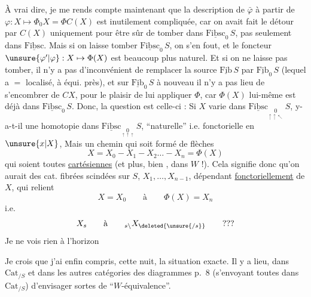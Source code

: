 À vrai dire, je me rends compte maintenant que la description de $\bar\varphi$ à partir de $\varphi:X\longmapsto\Phi_0 X=\Phi C(X)$ est inutilement compliquée, car on avait fait le détour par $C(X)$ uniquement pour être sûr de tomber dans $\underline{\mathrm{Fibsc}}_0\,S$, pas seulement dans $\underline{\mathrm{Fibsc}}$.
Mais si on laisse tomber $\underline{\mathrm{Fibsc}}_0\,S$, on s'en fout, et le foncteur $\unsure{\varphi'|\varphi}:X\mapsto\Phi(X)$ est beaucoup plus naturel. Et  si on ne laisse pas tomber, il n'y a pas d'inconvénient de remplacer la source $\underline{\mathrm{Fib}}\,S$
par $\underline{\mathrm{Fib}}_0\,S$ (lequel a $=$ localisé, à équi. près), et sur $\underline{\mathrm{Fib}}_0\,S$ à nouveau il n'y a pas lieu de s'encombrer de $CX$, pour le plaisir de lui appliquer $\Phi$, car $\Phi(X)$ lui-même est déjà dans $\underline{\mathrm{Fibsc}}_0\,S$. Donc, la question est celle-ci : Si $X$ varie
dans $\underline{\mathrm{Fibsc}}_{\underset{\uparrow\uparrow\nwarrow}{0}}\,S$, y-a-t-il une homotopie dans $\underline{\mathrm{Fibsc}}_{\underset{\uparrow\uparrow\uparrow}{0}}\,S$, ``naturelle'' i.e. fonctorielle en $\unsure{x|X}$,
Mais un chemin qui soit formé de flèches
\[
 X=X_0\mathbin{-}X_1\mathbin{-}X_2\ldots\mathbin{-}X_n=\Phi(X)
\]
qui soient toutes \uline{cartésiennes} (et  plus, bien , dans $W$ !). Cela signifie donc qu'on  aurait des  cat. fibrées scindées sur $S$, $X_1,\ldots,X_{n-1}$, dépendant \uline{fonctoriellement} de $X$, qui relient
\[
 X=X_0\qquad \text{à}\qquad \Phi(X)=X_n
\]
i.e.
\[
 X_s\qquad\text{à}\qquad {}_{s\backslash}X_{\deleted{\unsure{/s}}}\qquad ???
\]
Je ne vois rien à l'horizon

Je crois que j'ai enfin compris, cette nuit, la situation exacte. Il y a lieu, dans $\mathrm{Cat}_{/S}$ et dans les autres catégories des diagrammes p.~8 (s'envoyant toutes dans $\mathrm{Cat}_{/S}$)\unsure{,} d'envisager   sortes de ``$W$-équivalence''.

